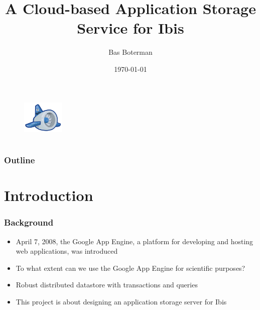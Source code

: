 \documentclass{beamer}
\title{A Cloud-based Application Storage Service for Ibis}
\author{Bas Boterman}
\date{\today}
\begin{document}
\frame
{
	\titlepage
	\begin{figure}[h]
	\begin{center}
	\includegraphics[width=2cm]{msc_logo.png} 
	\end{center}
	\end{figure}
}

\section[Outline]{}
\frame
{
	\frametitle{Outline}
	\tableofcontents
}

\section{Introduction}
\frame
{
	\frametitle{Background}
	\begin{itemize}
    	\item <1->April 7, 2008, the Google App Engine, a platform for developing
    		and hosting web applications, was introduced
    	\item <2->To what extent can we use the Google App Engine for scientific
      		purposes?
      	\item <3->Robust distributed datastore with transactions and queries
    	\item <4->This project is about designing an application storage server
    		for Ibis
    \end{itemize}
}



\end{document}
